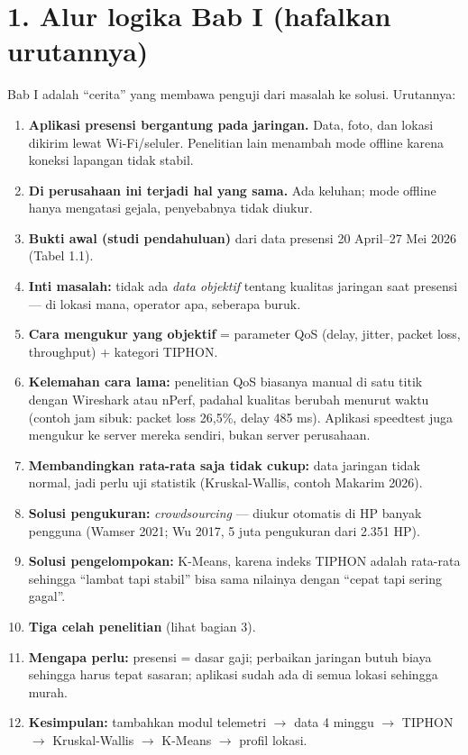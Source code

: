 \section*{1. Alur logika Bab I (hafalkan urutannya)}
Bab I adalah ``cerita'' yang membawa penguji dari masalah ke solusi. Urutannya:
\begin{enumerate}[label=\textbf{\arabic*.}]
  \item \textbf{Aplikasi presensi bergantung pada jaringan.} Data, foto, dan lokasi dikirim lewat Wi-Fi/seluler. Penelitian lain menambah mode offline karena koneksi lapangan tidak stabil.
  \item \textbf{Di perusahaan ini terjadi hal yang sama.} Ada keluhan; mode offline hanya mengatasi gejala, penyebabnya tidak diukur.
  \item \textbf{Bukti awal (studi pendahuluan)} dari data presensi 20 April--27 Mei 2026 (Tabel 1.1).
  \item \textbf{Inti masalah:} tidak ada \textit{data objektif} tentang kualitas jaringan saat presensi --- di lokasi mana, operator apa, seberapa buruk.
  \item \textbf{Cara mengukur yang objektif} = parameter QoS (delay, jitter, packet loss, throughput) + kategori TIPHON.
  \item \textbf{Kelemahan cara lama:} penelitian QoS biasanya manual di satu titik dengan Wireshark atau nPerf, padahal kualitas berubah menurut waktu (contoh jam sibuk: packet loss 26,5\%, delay 485 ms). Aplikasi speedtest juga mengukur ke server mereka sendiri, bukan server perusahaan.
  \item \textbf{Membandingkan rata-rata saja tidak cukup:} data jaringan tidak normal, jadi perlu uji statistik (Kruskal-Wallis, contoh Makarim 2026).
  \item \textbf{Solusi pengukuran:} \textit{crowdsourcing} --- diukur otomatis di HP banyak pengguna (Wamser 2021; Wu 2017, 5 juta pengukuran dari 2.351 HP).
  \item \textbf{Solusi pengelompokan:} K-Means, karena indeks TIPHON adalah rata-rata sehingga ``lambat tapi stabil'' bisa sama nilainya dengan ``cepat tapi sering gagal''.
  \item \textbf{Tiga celah penelitian} (lihat bagian 3).
  \item \textbf{Mengapa perlu:} presensi = dasar gaji; perbaikan jaringan butuh biaya sehingga harus tepat sasaran; aplikasi sudah ada di semua lokasi sehingga murah.
  \item \textbf{Kesimpulan:} tambahkan modul telemetri $\rightarrow$ data 4 minggu $\rightarrow$ TIPHON $\rightarrow$ Kruskal-Wallis $\rightarrow$ K-Means $\rightarrow$ profil lokasi.
\end{enumerate}

